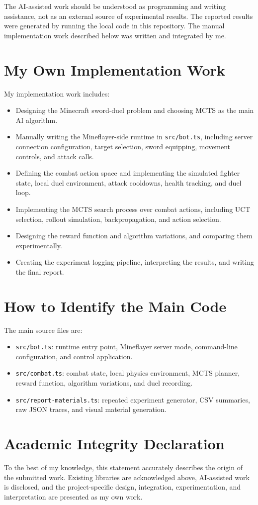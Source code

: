 \documentclass[11pt]{article}
\begin{document}
The AI-assisted work should be understood as programming and writing assistance, not as an external source of experimental results. The reported results were generated by running the local code in this repository. The manual implementation work described below was written and integrated by me.
\section*{My Own Implementation Work}

My implementation work includes:
\begin{itemize}
\item Designing the Minecraft sword-duel problem and choosing MCTS as the main AI algorithm.
\item Manually writing the Mineflayer-side runtime in \texttt{src/bot.ts}, including server connection configuration, target selection, sword equipping, movement controls, and attack calls.
\item Defining the combat action space and implementing the simulated fighter state, local duel environment, attack cooldowns, health tracking, and duel loop.
\item Implementing the MCTS search process over combat actions, including UCT selection, rollout simulation, backpropagation, and action selection.
\item Designing the reward function and algorithm variations, and comparing them experimentally.
\item Creating the experiment logging pipeline, interpreting the results, and writing the final report.
\end{itemize}

\section*{How to Identify the Main Code}

The main source files are:
\begin{itemize}
  \item \texttt{src/bot.ts}: runtime entry point, Mineflayer server mode, command-line configuration, and control application.
  \item \texttt{src/combat.ts}: combat state, local physics environment, MCTS planner, reward function, algorithm variations, and duel recording.
  \item \texttt{src/report-materials.ts}: repeated experiment generator, CSV summaries, raw JSON traces, and visual material generation.
\end{itemize}

\section*{Academic Integrity Declaration}

To the best of my knowledge, this statement accurately describes the origin of the submitted work. Existing libraries are acknowledged above, AI-assisted work is disclosed, and the project-specific design, integration, experimentation, and interpretation are presented as my own work.
\end{document}
